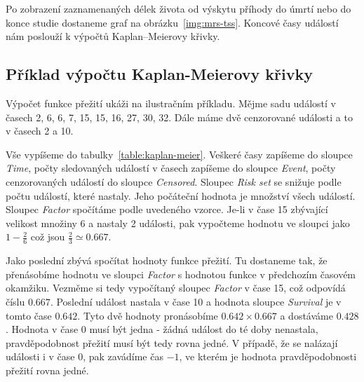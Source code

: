 Po zobrazení zaznamenaných délek života od výskytu příhody do úmrtí nebo do konce studie dostaneme graf na obrázku~\ref{img:mrs-tss}.
Koncové časy událostí nám poslouží k výpočtů Kaplan–Meierovy křivky.

\subsection{Příklad výpočtu Kaplan-Meierovy křivky}

Výpočet funkce přežití ukáži na ilustračním příkladu.
Mějme sadu událostí v časech 2, 6, 6, 7, 15, 15, 16, 27, 30, 32.
Dále máme dvě cenzorované události a to v časech 2 a 10.

Vše vypíšeme do tabulky~\ref{table:kaplan-meier}.
Veškeré časy zapíšeme do sloupce \textit{Time}, počty sledovaných událostí v časech zapíšeme do sloupce \textit{Event}, počty cenzorovaných událostí do sloupce \textit{Censored}.
Sloupec \textit{Risk set} se snižuje podle počtu událostí, které nastaly.
Jeho počáteční hodnota je množství všech událostí.
Sloupec \textit{Factor} spočítáme podle uvedeného vzorce.
Je-li v čase 15 zbývající velikost množiny 6 a nastaly 2 události, pak vypočteme hodnotu ve sloupci jako \( 1 - \frac{2}{6} \) což jsou \( \frac{2}{3} \simeq 0.667 \).

Jako poslední zbývá spočítat hodnoty funkce přežití.
Tu dostaneme tak, že přenásobíme hodnotu ve sloupci \textit{Factor} s hodnotou funkce v předchozím časovém okamžiku.
Vezměme si tedy vypočítaný sloupec \textit{Factor} v čase 15, což odpovídá číslu \( 0.667 \).
Poslední událost nastala v čase 10 a hodnota sloupce \textit{Survival} je v tomto čase \( 0.642 \).
Tyto dvě hodnoty pronásobíme \( 0.642 \times 0.667 \) a dostáváme \( 0.428 \).
Hodnota v čase 0 musí být jedna - žádná událost do té doby nenastala, pravděpodobnost přežití musí být tedy rovna jedné.
V případě, že se nalázají události i v čase 0, pak zavádíme čas \( -1 \), ve kterém je hodnota pravděpodobnosti přežití rovna jedné.

